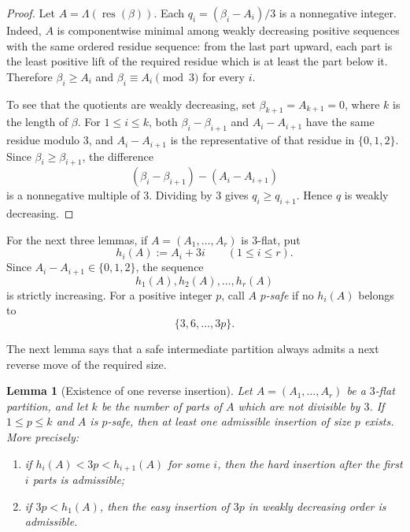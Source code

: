 \documentclass[11pt]{amsart}
\newtheorem{lemma}[theorem]{Lemma}
\theoremstyle{definition}
\theoremstyle{remark}
\newcommand{\res}{\operatorname{res}}
\begin{document}
\begin{proof}
Let $A=\Lambda(\res(\beta))$.  Each $q_i=(\beta_i-A_i)/3$ is a nonnegative integer.  Indeed, $A$ is componentwise minimal among weakly decreasing positive sequences with the same ordered residue sequence: from the last part upward, each part is the least positive lift of the required residue which is at least the part below it.  Therefore $\beta_i\ge A_i$ and $\beta_i\equiv A_i\pmod3$ for every $i$.

To see that the quotients are weakly decreasing, set $\beta_{k+1}=A_{k+1}=0$, where $k$ is the length of $\beta$.  For $1\le i\le k$, both $\beta_i-\beta_{i+1}$ and $A_i-A_{i+1}$ have the same residue modulo $3$, and $A_i-A_{i+1}$ is the representative of that residue in $\{0,1,2\}$.  Since $\beta_i\ge\beta_{i+1}$, the difference
\[
        (\beta_i-\beta_{i+1})-(A_i-A_{i+1})
\]
is a nonnegative multiple of $3$.  Dividing by $3$ gives $q_i\ge q_{i+1}$.  Hence $q$ is weakly decreasing.
\end{proof}



For the next three lemmas, if \(A=(A_1,\ldots,A_r)\) is \(3\)-flat, put
\[
        h_i(A):=A_i+3i\qquad (1\le i\le r).
\]
Since \(A_i-A_{i+1}\in\{0,1,2\}\), the sequence
\[
        h_1(A),h_2(A),\ldots,h_r(A)
\]
is strictly increasing.  For a positive integer \(p\), call \(A\)
\emph{\(p\)-safe} if no \(h_i(A)\) belongs to
\[
        \{3,6,\ldots,3p\}.
\]

The next lemma says that a safe intermediate partition always admits a next reverse move of the required size.

\begin{lemma}[Existence of one reverse insertion]\label{lem:exist-insertion}
Let \(A=(A_1,\ldots,A_r)\) be a \(3\)-flat partition, and let \(k\) be the number
of parts of \(A\) which are not divisible by \(3\).  If \(1\le p\le k\) and
\(A\) is \(p\)-safe, then at least one admissible insertion of size \(p\) exists.
More precisely:
\begin{enumerate}[label=(\roman*),leftmargin=2.6em]
\item if \(h_i(A)<3p<h_{i+1}(A)\) for some \(i\), then the hard insertion
after the first \(i\) parts is admissible;
\item if \(3p<h_1(A)\), then the easy insertion of \(3p\) in weakly decreasing
order is admissible.
\end{enumerate}
\end{lemma}
\end{document}
